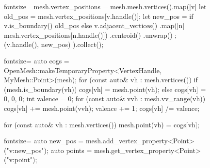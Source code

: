 \begin{figure}[p]
  \begin{minipage}{.04\textwidth}
  \end{minipage}
  \begin{minipage}{.9\textwidth}
    \begin{rustcode*}{fontsize=\footnotesize}
      mesh.vertex_positions = mesh.mesh.vertices().map(|v| {
          let old_pos = mesh.vertex_positions[v.handle()];
          let new_pos = if v.is_boundary() {
              old_pos
          } else {
              v.adjacent_vertices()
                  .map(|n| mesh.vertex_positions[n.handle()])
                  .centroid()
                  .unwrap()
          };
          (v.handle(), new_pos)
      }).collect();
    \end{rustcode*}
  \end{minipage}\vspace{2mm}

  \begin{minipage}{.04\textwidth}
  \end{minipage}
  \begin{minipage}{.9\textwidth}
    \begin{cppcode*}{fontsize=\footnotesize}
      auto cogs = OpenMesh::makeTemporaryProperty<VertexHandle, MyMesh::Point>(mesh);
      for (const auto& vh : mesh.vertices()) {
          if (mesh.is_boundary(vh)) {
              cogs[vh] = mesh.point(vh);
          } else {
              cogs[vh] = {0, 0, 0};
              int valence = 0;
              for (const auto& vvh : mesh.vv_range(vh)) {
                  cogs[vh] += mesh.point(vvh);
                  valence += 1;
              }
              cogs[vh] /= valence;
          }
      }

      for (const auto& vh : mesh.vertices()) {
          mesh.point(vh) = cogs[vh];
      }
    \end{cppcode*}
  \end{minipage}\vspace{2mm}

  \begin{minipage}{.04\textwidth}
  \end{minipage}
  \begin{minipage}{.9\textwidth}
    \begin{cppcode*}{fontsize=\footnotesize}
      auto new_pos = mesh.add_vertex_property<Point>("v:new_pos");
      auto points = mesh.get_vertex_property<Point>("v:point");


\end{cppcode*}
\end{minipage}
\end{figure}
